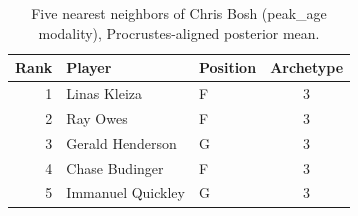 \begin{table}[htbp]
  \centering\small
  \begin{tabular}{rllc}
    \toprule
    Rank & Player & Position & Archetype \\
    \midrule
    1 & Linas Kleiza & F & 3 \\
    2 & Ray Owes & F & 3 \\
    3 & Gerald Henderson & G & 3 \\
    4 & Chase Budinger & F & 3 \\
    5 & Immanuel Quickley & G & 3 \\
    \bottomrule
  \end{tabular}
  \caption{Five nearest neighbors of Chris Bosh (peak_age modality), Procrustes-aligned posterior mean.}
  \label{tab:Chris_Bosh_neighbors_peak_age}
\end{table}

